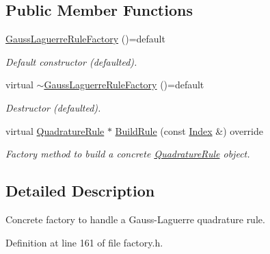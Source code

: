 \subsection*{Public Member Functions}
\begin{DoxyCompactItemize}
\item 
\hypertarget{classGaussLaguerreRuleFactory_aec92163584eea1e9fdc921afdfafba2e}{\hyperlink{classGaussLaguerreRuleFactory_aec92163584eea1e9fdc921afdfafba2e}{Gauss\-Laguerre\-Rule\-Factory} ()=default}\label{classGaussLaguerreRuleFactory_aec92163584eea1e9fdc921afdfafba2e}

\begin{DoxyCompactList}\small\item\em Default constructor (defaulted). \end{DoxyCompactList}\item 
\hypertarget{classGaussLaguerreRuleFactory_a8d39539bf7e6dd34cc298cf8c58060c8}{virtual \hyperlink{classGaussLaguerreRuleFactory_a8d39539bf7e6dd34cc298cf8c58060c8}{$\sim$\-Gauss\-Laguerre\-Rule\-Factory} ()=default}\label{classGaussLaguerreRuleFactory_a8d39539bf7e6dd34cc298cf8c58060c8}

\begin{DoxyCompactList}\small\item\em Destructor (defaulted). \end{DoxyCompactList}\item 
virtual \hyperlink{classQuadratureRule}{Quadrature\-Rule} $\ast$ \hyperlink{classGaussLaguerreRuleFactory_a1e907a5209041516fa18c86c79fb1ec6}{Build\-Rule} (const \hyperlink{typedefs_8h_a2c726f8f32697958e9d6c2afecda531d}{Index} \&) override
\begin{DoxyCompactList}\small\item\em Factory method to build a concrete \hyperlink{classQuadratureRule}{Quadrature\-Rule} object. \end{DoxyCompactList}\end{DoxyCompactItemize}


\subsection{Detailed Description}
Concrete factory to handle a Gauss-\/\-Laguerre quadrature rule. 

Definition at line 161 of file factory.\-h.



